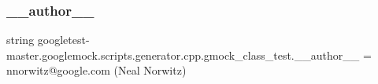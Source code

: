 \subsubsection{\texorpdfstring{\_\_author\_\_}{\_\_author\_\_}}
{\footnotesize\ttfamily string googletest-\/master.\+googlemock.\+scripts.\+generator.\+cpp.\+gmock\+\_\+class\+\_\+test.\+\_\+\+\_\+author\+\_\+\+\_\+ = \textquotesingle{}nnorwitz@google.\+com (Neal Norwitz)\textquotesingle{}\hspace{0.3cm}{\ttfamily [private]}}

